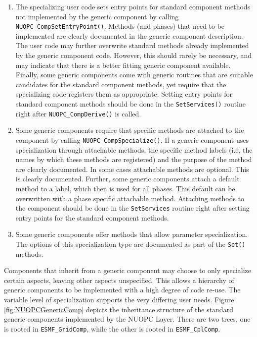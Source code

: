 \begin{enumerate}

\item The specializing user code sets entry points for standard component methods not implemented by the generic component by calling {\tt NUOPC\_CompSetEntryPoint()}. Methods (and phases) that need to be implemented are clearly documented in the generic component description. The user code may further overwrite standard methods already implemented by the generic component code. However, this should rarely be necessary, and may indicate that there is a better fitting generic component available. Finally, some generic components come with generic routines that are suitable candidates for the standard component methods, yet require that the specializing code registers them as appropriate. Setting entry points for standard component methods should be done in the {\tt SetServices()} routine right after {\tt NUOPC\_CompDerive()} is called.

\item Some generic components require that specific methods are attached to the component by calling {\tt NUOPC\_CompSpecialize()}. If a generic component uses specialization through attachable methods, the specific method labels (i.e. the names by which these methods are registered) and the purpose of the method are clearly documented. In some cases attachable methods are optional. This is clearly documented. Further, some generic components attach a default method to a label, which then is used for all phases. This default can be overwritten with a phase specific attachable method. Attaching methods to the component should be done in the {\tt SetServices} routine right after setting entry points for the standard component methods.

\item Some generic components offer methods that allow parameter specialization. The options of this specialization type are documented as part of the {\tt Set()} methods.

\end{enumerate}

Components that inherit from a generic component may choose to only specialize certain aspects, leaving other aspects unspecified. This allows a hierarchy of generic components to be implemented with a high degree of code re-use. The variable level of specialization supports the very differing user needs. Figure \ref{fig:NUOPCGenericComp} depicts the inheritance structure of the standard generic components implemented by the NUOPC Layer. There are two trees, one is rooted in {\tt ESMF\_GridComp}, while the other is rooted in {\tt ESMF\_CplComp}.

